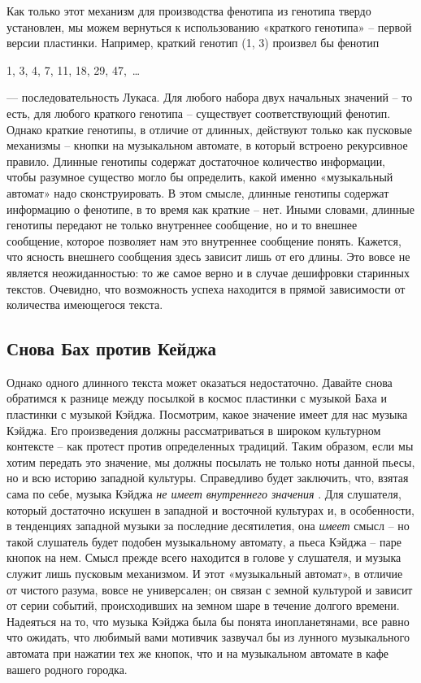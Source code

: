 \documentclass[../main.tex]{subfiles}
\begin{document}
Как только этот механизм для производства фенотипа из генотипа твердо установлен, мы можем вернуться к использованию «краткого генотипа» \--- первой версии пластинки. Например, краткий генотип (1, 3) произвел бы фенотип

1, 3, 4, 7, 11, 18, 29, 47,~\ldots{}

--- последовательность Лукаса. Для любого набора двух начальных значений \--- то есть, для любого краткого генотипа \--- существует соответствующий фенотип. Однако краткие генотипы, в отличие от длинных, действуют только как пусковые механизмы \--- кнопки на музыкальном автомате, в который встроено рекурсивное правило. Длинные генотипы содержат достаточное количество информации, чтобы разумное существо могло бы определить, какой именно «музыкальный автомат» надо сконструировать. В этом смысле, длинные генотипы содержат информацию о фенотипе, в то время как краткие \--- нет. Иными словами, длинные генотипы передают не только внутреннее сообщение, но и то внешнее сообщение, которое позволяет нам это внутреннее сообщение понять. Кажется, что ясность внешнего сообщения здесь зависит лишь от его длины. Это вовсе не является неожиданностью: то же самое верно и в случае дешифровки старинных текстов. Очевидно, что возможность успеха находится в прямой зависимости от количества имеющегося текста.


\subsection{Снова Бах против Кейджа}

Однако одного длинного текста может оказаться недостаточно. Давайте снова обратимся к разнице между посылкой в космос пластинки с музыкой Баха и пластинки с музыкой Кэйджа. Посмотрим, какое значение имеет для нас музыка Кэйджа. Его произведения должны рассматриваться в широком культурном контексте \--- как протест против определенных традиций. Таким образом, если мы хотим передать это значение, мы должны посылать не только ноты данной пьесы, но и всю историю западной культуры. Справедливо будет заключить, что, взятая сама по себе, музыка Кэйджа \emph{не имеет внутреннего значения} . Для слушателя, который достаточно искушен в западной и восточной культурах и, в особенности, в тенденциях западной музыки за последние десятилетия, она \emph{имеет} смысл \--- но такой слушатель будет подобен музыкальному автомату, а пьеса Кэйджа \--- паре кнопок на нем. Смысл прежде всего находится в голове у слушателя, и музыка служит лишь пусковым механизмом. И этот «музыкальный автомат», в отличие от чистого разума, вовсе не универсален; он связан с земной культурой и зависит от серии событий, происходивших на земном шаре в течение долгого времени. Надеяться на то, что музыка Кэйджа была бы понята инопланетянами, все равно что ожидать, что любимый вами мотивчик зазвучал бы из лунного музыкального автомата при нажатии тех же кнопок, что и на музыкальном автомате в кафе вашего родного городка.
\end{document}
